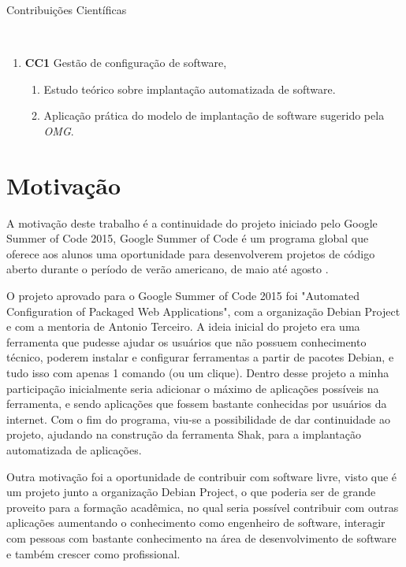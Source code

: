 \begin{description}
  \item [Contribuições Científicas]\
\end{description}
    \begin{enumerate}
      \item \textbf{CC1} Gestão de configuração de software,
        \begin{enumerate}
          \item Estudo teórico sobre implantação automatizada de software.
          \item Aplicação prática do modelo de implantação de software sugerido
pela \textit{OMG}.
        \end{enumerate}
    \end{enumerate}


\section{Motivação}
\label{sec:motivacao}
A motivação deste trabalho é a continuidade do projeto iniciado pelo Google Summer
of Code 2015, Google Summer of Code é um programa global que oferece aos
alunos uma oportunidade para desenvolverem projetos de código aberto durante o período
de verão americano, de maio até agosto \cite{gsoc2015}.

O projeto aprovado para o Google Summer of Code 2015 foi "Automated Configuration
of Packaged Web Applications", com a organização Debian Project e com a mentoria de
Antonio Terceiro. A ideia inicial do projeto era uma ferramenta que
pudesse ajudar os usuários que não possuem conhecimento técnico, poderem
instalar e configurar ferramentas a partir de pacotes Debian, e tudo isso com
apenas 1 comando (ou um clique). Dentro desse projeto a minha participação
inicialmente seria adicionar o máximo de aplicações possíveis na ferramenta,
e sendo aplicações que fossem bastante conhecidas por usuários da internet. Com o
 fim do programa, viu-se a possibilidade de dar continuidade ao projeto, ajudando
na construção da ferramenta Shak, para a implantação automatizada de aplicações.

Outra motivação foi a oportunidade de contribuir com software livre, visto que é
um projeto junto a organização Debian Project, o que poderia ser de grande proveito
para a formação acadêmica, no qual seria possível contribuir com outras
aplicações aumentando o conhecimento como engenheiro de software, interagir com
pessoas com bastante conhecimento na área de desenvolvimento de software e também
crescer como profissional.

